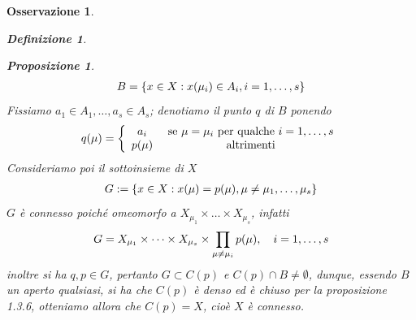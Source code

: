 \documentclass[oneside, 11pt]{amsbook}
\makeatletter
\newcommand{\0}{{(0)}}
\newcommand{\3}{{(3)}}
\theoremstyle{colonplain}
\newtheorem{prop}[thm]{Proposizione}
\theoremstyle{colondefinition}
\newtheorem{defn}[thm]{Definizione}
\theoremstyle{colonremark}
\newtheorem{rmk}[thm]{Osservazione}
\numberwithin{equation}{chapter}
\renewcommand{\proofname}{Dimostrazione}
\renewenvironment{proof}[1][\proofname]{\par
  \pushQED{\end{proof}}%
  \normalfont \topsep6\p@\@plus6\p@\relax
  \trivlist
  \item[\hskip\labelsep\bfseries #1:]\ignorespaces
}{%
  \popQED\endtrivlist\@endpefalse
}
\makeatother
\begin{document}
\begin{rmk}
\begin{defn}
\begin{prop}
\begin{proof}
\begin{align}
    B = \{ x \in X : x(\mu_i) \in A_i, i = 1, \dots, s \} \notag
\end{align}
Fissiamo $a_1 \in A_1, \dots, a_s \in A_s$; denotiamo il punto $q$ di $B$ ponendo
\begin{align}
    q(\mu) = \left\{ \begin{array}{cc} 
         a_i& \text{ se } \mu = \mu_i \text{ per qualche } i = 1, \dots, s  \\
         p(\mu)& \text{ altrimenti} \notag
    \end{array} \right.
\end{align}
Consideriamo poi il sottoinsieme di $X$
\begin{align}
    G := \{ x \in X : x(\mu) = p(\mu), \mu \neq \mu_1, \dots, \mu_s \} \notag
\end{align}
$G$ è connesso poiché omeomorfo a $X_{\mu_1} \times \dots \times X_{\mu_s}$, infatti
\begin{align}
    G = X_{\mu_1} \times \dots \times X_{\mu_s} \times \prod_{\mu \neq \mu_i} p(\mu), \quad i = 1, \dots, s \notag
\end{align}
inoltre si ha $q, p \in G$, pertanto $G \subset C(p)$ e $C(p) \cap B \neq \emptyset$, dunque, essendo $B$ un aperto qualsiasi, si ha che $C(p)$ è denso ed è chiuso per la \textit{proposizione 1.3.6}, otteniamo allora che $C(p) = X$, cioè $X$ è connesso.
\end{proof}


\end{prop}
\end{defn}
\end{rmk}
\end{document}
